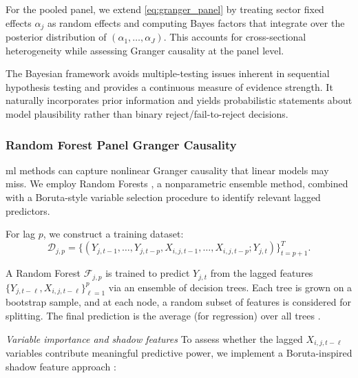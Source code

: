 \documentclass[preprint, 3p,
authoryear]{elsarticle} %
\begin{document}
For the pooled panel, we extend \eqref{eq:granger_panel} by treating
sector fixed effects \(\alpha_j\) as random effects and computing Bayes
factors that integrate over the posterior distribution of
\((\alpha_1,\ldots,\alpha_J)\). This accounts for cross-sectional
heterogeneity while assessing Granger causality at the panel level.

The Bayesian framework avoids multiple-testing issues inherent in
sequential hypothesis testing and provides a continuous measure of
evidence strength. It naturally incorporates prior information and
yields probabilistic statements about model plausibility rather than
binary reject/fail-to-reject decisions.

\subsubsection{Random Forest Panel Granger Causality}\label{sec:rfpgc}

\gls{ml} methods can capture nonlinear Granger causality that linear
models may miss. We employ Random Forests \citep{breiman2001}, a
nonparametric ensemble method, combined with a Boruta-style variable
selection procedure \citep{kursa2010} to identify relevant lagged
predictors.

For lag \(p\), we construct a training dataset: \begin{equation}
\mathcal{D}_{j,p} = \bigl\{ (Y_{j,t-1},\ldots,Y_{j,t-p}, X_{i,j,t-1},\ldots,X_{i,j,t-p}; Y_{j,t}) \bigr\}_{t=p+1}^{T}.
\label{eq:rf_data}
\end{equation}

\noindent A Random Forest \(\mathcal{F}_{j,p}\) is trained to predict
\(Y_{j,t}\) from the lagged features
\(\{Y_{j,t-\ell}, X_{i,j,t-\ell}\}_{\ell=1}^p\) via an ensemble of
decision trees. Each tree is grown on a bootstrap sample, and at each
node, a random subset of features is considered for splitting. The final
prediction is the average (for regression) over all trees
\citep{breiman2001}.

\textit{Variable importance and shadow features} To assess whether the
lagged \(X_{i,j,t-\ell}\) variables contribute meaningful predictive
power, we implement a Boruta-inspired shadow feature approach
\citep{kursa2010}:
\end{document}
